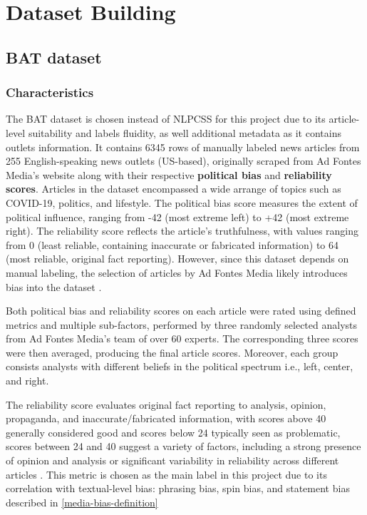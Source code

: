 \chapter{Dataset Building}
\label{cha:4}

\section{BAT dataset}

\subsection{Characteristics} \label{bat-characteristics}

The BAT dataset \cite{spinde-2023-bat} is chosen instead of NLPCSS \cite{chen-etal-2020-nlpcss} for this project due to its article-level suitability and labels fluidity, as well additional metadata as it contains outlets information. It contains 6345 rows of manually labeled news articles from 255 English-speaking news outlets (US-based), originally scraped from Ad Fontes Media's website along with their respective \textbf{political bias} and \textbf{reliability scores}. Articles in the dataset encompassed a wide arrange of topics such as COVID-19, politics, and lifestyle. The political bias score measures the extent of political influence, ranging from -42 (most extreme left) to +42 (most extreme right). The reliability score reflects the article's truthfulness, with values ranging from 0 (least reliable, containing inaccurate or fabricated information) to 64 (most reliable, original fact reporting). However, since this dataset depends on manual labeling, the selection of articles by Ad Fontes Media likely introduces bias into the dataset \cite{spinde-2023-bat}.

Both political bias and reliability scores on each article were rated using defined metrics and multiple sub-factors, performed by three randomly selected analysts from Ad Fontes Media's team of over 60 experts. The corresponding three scores were then averaged, producing the final article scores. Moreover, each group consists analysts with different beliefs in the political spectrum i.e., left, center, and right.

The reliability score evaluates original fact reporting to analysis, opinion, propaganda, and inaccurate/fabricated information, with scores above 40 generally considered good and scores below 24 typically seen as problematic, scores between 24 and 40 suggest a variety of factors, including a strong presence of opinion and analysis or significant variability in reliability across different articles \cite{adfontes}. This metric is chosen as the main label in this project due to its correlation with textual-level bias: phrasing bias, spin bias, and statement bias described in \ref{media-bias-definition}


